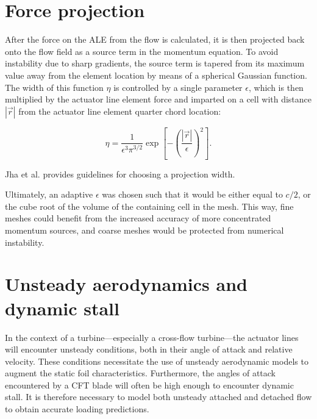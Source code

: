 


\section{Force projection}

After the force on the ALE from the flow is calculated, it is then projected
back onto the flow field as a source term in the momentum equation. To avoid
instability due to sharp gradients, the source term is tapered from its maximum
value away from the element location by means of a spherical Gaussian function.
The width of this function $\eta$ is controlled by a single parameter
$\epsilon$, which is then multiplied by the actuator line element force and
imparted on a cell with distance $| \vec{r} |$ from the actuator line element
quarter chord location:

\begin{equation}
    \eta = \frac{1}{\epsilon^3 \pi^{3/2}} \exp 
    \left[ - \left( \frac{| \vec{r} |}{\epsilon} \right)^2 \right].
    \label{eq:projection}
\end{equation}

Jha et al. \cite{Jha2014} provides guidelines for choosing a projection width.

Ultimately, an adaptive $\epsilon$ was chosen such that it would be either equal
to $c/2$, or the cube root of the volume of the containing cell in the mesh.
This way, fine meshes could benefit from the increased accuracy of more
concentrated momentum sources, and coarse meshes would be protected from
numerical instability. 


\section{Unsteady aerodynamics and dynamic stall}

In the context of a turbine---especially a cross-flow turbine---the actuator
lines will encounter unsteady conditions, both in their angle of attack and
relative velocity. These conditions necessitate the use of unsteady aerodynamic
models to augment the static foil characteristics. Furthermore, the angles of
attack encountered by a CFT blade will often be high enough to encounter dynamic
stall. It is therefore necessary to model both unsteady attached and detached
flow to obtain accurate loading predictions.

